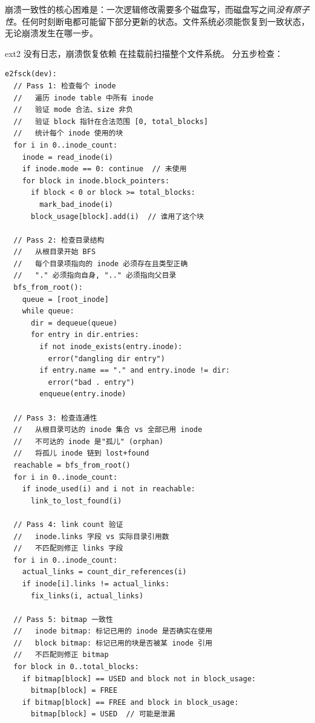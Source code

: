 \begin{filesystemlayout}
\begin{keyidea}
崩溃一致性的核心困难是：一次逻辑修改需要多个磁盘写，而磁盘写之间\emph{没有原子性}。任何时刻断电都可能留下部分更新的状态。文件系统必须能恢复到一致状态，无论崩溃发生在哪一步。
\end{keyidea}


ext2 没有日志，崩溃恢复依赖  在挂载前扫描整个文件系统。 分五步检查：

\begin{lstlisting}
e2fsck(dev):
  // Pass 1: 检查每个 inode
  //   遍历 inode table 中所有 inode
  //   验证 mode 合法、size 非负
  //   验证 block 指针在合法范围 [0, total_blocks]
  //   统计每个 inode 使用的块
  for i in 0..inode_count:
    inode = read_inode(i)
    if inode.mode == 0: continue  // 未使用
    for block in inode.block_pointers:
      if block < 0 or block >= total_blocks:
        mark_bad_inode(i)
      block_usage[block].add(i)  // 谁用了这个块

  // Pass 2: 检查目录结构
  //   从根目录开始 BFS
  //   每个目录项指向的 inode 必须存在且类型正确
  //   "." 必须指向自身, ".." 必须指向父目录
  bfs_from_root():
    queue = [root_inode]
    while queue:
      dir = dequeue(queue)
      for entry in dir.entries:
        if not inode_exists(entry.inode):
          error("dangling dir entry")
        if entry.name == "." and entry.inode != dir:
          error("bad . entry")
        enqueue(entry.inode)

  // Pass 3: 检查连通性
  //   从根目录可达的 inode 集合 vs 全部已用 inode
  //   不可达的 inode 是"孤儿" (orphan)
  //   将孤儿 inode 链到 lost+found
  reachable = bfs_from_root()
  for i in 0..inode_count:
    if inode_used(i) and i not in reachable:
      link_to_lost_found(i)

  // Pass 4: link count 验证
  //   inode.links 字段 vs 实际目录引用数
  //   不匹配则修正 links 字段
  for i in 0..inode_count:
    actual_links = count_dir_references(i)
    if inode[i].links != actual_links:
      fix_links(i, actual_links)

  // Pass 5: bitmap 一致性
  //   inode bitmap: 标记已用的 inode 是否确实在使用
  //   block bitmap: 标记已用的块是否被某 inode 引用
  //   不匹配则修正 bitmap
  for block in 0..total_blocks:
    if bitmap[block] == USED and block not in block_usage:
      bitmap[block] = FREE
    if bitmap[block] == FREE and block in block_usage:
      bitmap[block] = USED  // 可能是泄漏
\end{lstlisting}


\end{filesystemlayout}
